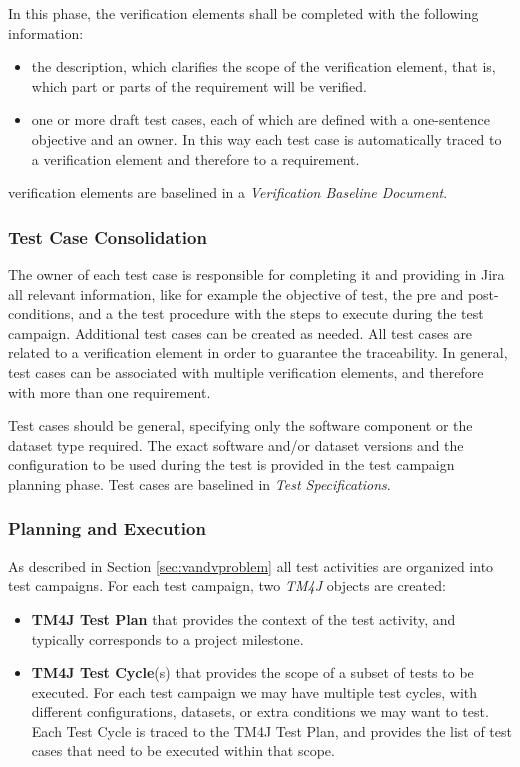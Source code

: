 In this phase, the verification elements shall be completed with the following information:
\begin{itemize}
\item the description, which clarifies the scope of the verification element, that is, which part or parts of the requirement will be verified.
\item one or more draft test cases, each of which are defined with a one-sentence objective and an owner. 
In this way each test case is automatically traced to a verification element and therefore to a requirement.
\end{itemize}
verification elements are baselined in a \textit{Verification Baseline Document}.


\subsubsection{Test Case Consolidation}

The owner of each test case is responsible for completing it and providing in Jira all relevant information, like for example 
the objective of test, the pre and post-conditions, and a the test procedure with the steps to execute during the test campaign.
Additional test cases can be created as needed. All test cases are related to a verification element in order to guarantee the traceability.
In general, test cases can be associated with multiple verification elements, and therefore with more than one requirement.

Test cases should be general, specifying only the software component or the dataset type required.
The exact software and/or dataset versions and the configuration to be used during the test
is provided in the test campaign planning phase.
Test cases are baselined in \textit{Test Specifications}.

\subsubsection{Planning and Execution}

As described in Section \ref{sec:vandvproblem} all test activities are organized into test campaigns.
For each test campaign, two \textit{TM4J} objects are created:

\begin{itemize}
\item \textbf{TM4J Test Plan} that provides the context of the test activity, and typically corresponds to a project milestone.
\item \textbf{TM4J Test Cycle}(s) that provides the scope of a subset of tests to be executed. For each test campaign we may have multiple test cycles,
with different configurations, datasets, or extra conditions we may want to test. Each Test Cycle is traced
to the TM4J Test Plan, and provides the list of test cases that need to be executed within that scope.
\end{itemize}

